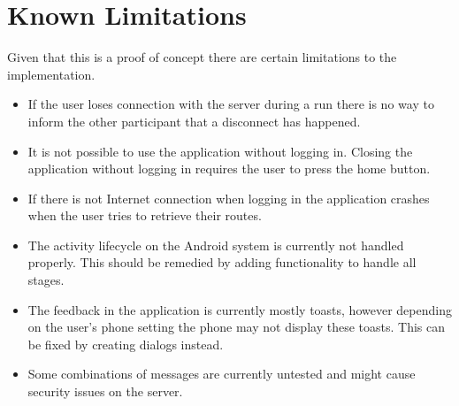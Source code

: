 \section{Known Limitations}
Given that this is a proof of concept there are certain limitations to the implementation.

\begin{itemize}
\item If the user loses connection with the server during a run there is no way to inform the other participant that a disconnect has happened.
\item It is not possible to use the application without logging in. Closing the application without logging in requires the user to press the home button.
\item If there is not Internet connection when logging in the application crashes when the user tries to retrieve their routes.
\item The activity lifecycle on the Android system is currently not handled properly. This should be remedied by adding functionality to handle all stages.
\item The feedback in the application is currently mostly toasts, however depending on the user's phone setting the phone may not display these toasts. This can be fixed by creating dialogs instead.
\item Some combinations of messages are currently untested and might cause security issues on the server.
\end{itemize}
